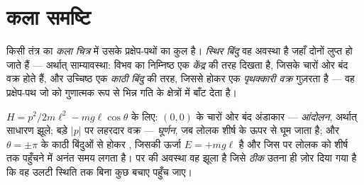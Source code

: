 \section{कला समष्टि}

\begin{definition}[कला चित्र, स्थिर बिंदु, पृथक्कारी वक्र]\label{def:b3:hamiltonian-mechanics:portrait}
किसी तंत्र का \emph{कला चित्र}  में उसके
प्रक्षेप-पथों का कुल है। \emph{स्थिर बिंदु} वह अवस्था है जहाँ
दोनों  लुप्त हो जाते हैं --- अर्थात् साम्यावस्था: विभव का
निम्निष्ठ एक \emph{केंद्र} की तरह दिखता है, जिसके चारों ओर बंद वक्र
होते हैं, और उच्चिष्ठ एक \emph{काठी बिंदु} की तरह, जिससे होकर एक
\emph{पृथक्कारी वक्र} गुज़रता है --- वह प्रक्षेप-पथ जो  को
गुणात्मक रूप से भिन्न गति के क्षेत्रों में बाँट देता है।
\end{definition}

\begin{example}[लोलक का कला चित्र]\label{ex:b3:hamiltonian-mechanics:pendulum-portrait}
$H = p^2/2m\ell^2 - mg\ell\cos\theta$ के लिए: $(0, 0)$ के चारों ओर बंद
अंडाकार --- \emph{आंदोलन}, अर्थात् साधारण झूले; बड़े
$|p|$ पर लहरदार वक्र --- \emph{घूर्णन}, जब लोलक शीर्ष के ऊपर से घूम
जाता है; और $\theta = \pm\pi$ के काठी बिंदुओं से होकर ,
जिसकी ऊर्जा $E = +mg\ell$ है और जिस पर लोलक को शीर्ष तक पहुँचने में
अनंत समय लगता है।  पर की अवस्था वह झूला है जिसे
\emph{ठीक} उतना ही ज़ोर दिया गया है कि वह उलटी स्थिति तक बिना कुछ बचाए
पहुँच जाए।
\end{example}

